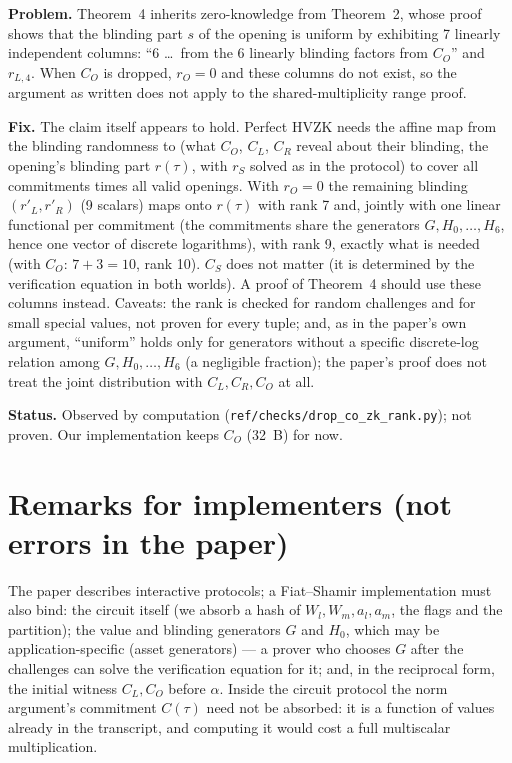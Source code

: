 \documentclass[11pt,a4paper]{article}
\newcommand{\status}[1]{\par\noindent\textbf{Status.} #1}
\begin{document}
\noindent\textbf{Problem.} Theorem~4 inherits zero-knowledge from Theorem~2, whose proof shows that
the blinding part $s$ of the opening is uniform by exhibiting 7 linearly independent columns:
``6 \dots\ from the 6 linearly blinding factors from $C_O$'' and $r_{L,4}$. When $C_O$ is dropped,
$r_O = 0$ and these columns do not exist, so the argument as written does not apply to the
shared-multiplicity range proof.

\noindent\textbf{Fix.} The claim itself appears to hold. Perfect HVZK needs the affine map from the
blinding randomness to (what $C_O$, $C_L$, $C_R$ reveal about their blinding, the opening's blinding
part $r(\tau)$, with $r_S$ solved as in the protocol) to cover all commitments times all valid
openings. With $r_O = 0$ the remaining blinding $(r'_L, r'_R)$ (9 scalars) maps onto $r(\tau)$ with rank
7 and, jointly with one linear functional per commitment (the commitments share the generators
$G, H_0, \dots, H_6$, hence one vector of discrete logarithms), with rank 9, exactly what is needed
(with $C_O$: $7 + 3 = 10$, rank 10). $C_S$ does not matter (it is determined by the verification
equation in both worlds). A proof of Theorem~4 should use these columns instead. Caveats: the
rank is checked for random challenges and for small special values, not proven for every tuple;
and, as in the paper's own argument, ``uniform'' holds only for generators without a specific
discrete-log relation among $G, H_0, \dots, H_6$ (a negligible fraction); the paper's proof does not
treat the joint distribution with $C_L, C_R, C_O$ at all.
\status{Observed by computation (\texttt{ref/checks/drop\_co\_zk\_rank.py}); not proven. Our
implementation keeps $C_O$ (32~B) for now.}

\section*{Remarks for implementers (not errors in the paper)}

The paper describes interactive protocols; a Fiat--Shamir implementation must also bind:
the circuit itself (we absorb a hash of $W_l, W_m, a_l, a_m$, the flags and the partition);
the value and blinding generators $G$ and $H_0$, which may be application-specific (asset
generators) --- a prover who chooses $G$ after the challenges can solve the verification
equation for it; and, in the reciprocal form, the initial witness $C_L, C_O$ before $\alpha$.
Inside the circuit protocol the norm argument's commitment $C(\tau)$ need not be absorbed: it is
a function of values already in the transcript, and computing it would cost a full
multiscalar multiplication.
\end{document}
